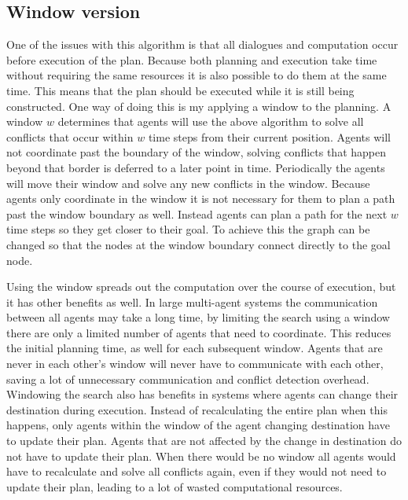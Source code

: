 \subsection{Window version}
One of the issues with this algorithm is that all dialogues and computation
occur before execution of the plan. Because both planning and execution take
time without requiring the same resources it is also possible to do them at the
same time. This means that the plan should be executed while it is still being
constructed. One way of doing this is my applying a window to the planning. A
window $w$ determines that agents will use the above algorithm to solve all
conflicts that occur within $w$ time steps from their current position. Agents
will not coordinate past the boundary of the window, solving conflicts that
happen beyond that border is deferred to a later point in time. Periodically
the agents will move their window and solve any new conflicts in the window.
Because agents only coordinate in the window it is not necessary for them to
plan a path past the window boundary as well. Instead agents can plan a path
for the next $w$ time steps so they get closer to their goal. To achieve this
the graph can be changed so that the nodes at the window boundary connect
directly to the goal node.

Using the window spreads out the computation over the course of execution, but
it has other benefits as well. In large multi-agent systems the communication
between all agents may take a long time, by limiting the search using a window
there are only a limited number of agents that need to coordinate. This reduces
the initial planning time, as well for each subsequent window. Agents that are
never in each other's window will never have to communicate with each other,
saving a lot of unnecessary communication and conflict detection overhead.
Windowing the search also has benefits in systems where agents can change their
destination during execution. Instead of recalculating the entire plan when
this happens, only agents within the window of the agent changing destination
have to update their plan. Agents that are not affected by the change in
destination do not have to update their plan. When there would be no window all
agents would have to recalculate and solve all conflicts again, even if they
would not need to update their plan, leading to a lot of wasted computational
resources.